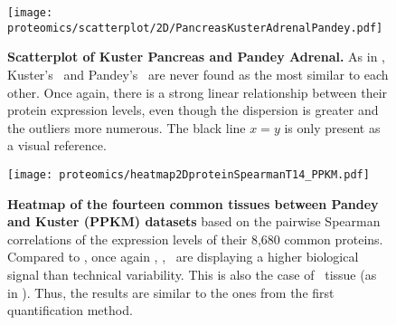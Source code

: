 \begin{figure}[!htpb]
    \texttt{[image: proteomics/scatterplot/2D/PancreasKusterAdrenalPandey.pdf]}\centering
    \caption[Kuster Pancreas vs Pandey Adrenal]{\label{fig:scat2DAdrenalPandeyPancreasKuster}\textbf{%
    Scatterplot of Kuster Pancreas and Pandey Adrenal.}
    As in ,
    Kuster's \pancreas\ and Pandey's \adrenal\ are never found as the most similar
    to each other.
    Once again,
    there is a strong linear relationship between their protein expression levels,
    even though the dispersion is greater and the outliers more numerous.
    {\small The black line $x=y$ is only present as a visual reference.}}
\end{figure}


\begin{figure}[!htpb]
    \texttt{[image: proteomics/heatmap2DproteinSpearmanT14\_PPKM.pdf]}\centering
    \caption[Heatmap of the 14 common tissues between Pandey and Kuster
    (Spearman correlation --- PPKM)]{\label{fig:heatmap3DProtT14PPKM}\textbf{Heatmap
    of the fourteen common tissues between Pandey and Kuster (PPKM) datasets}
    based on the pairwise Spearman correlations of the expression levels of
    their 8,680 common proteins.
    Compared to ,
    once again \Placenta, \Lung, \Kidney\ are displaying a higher biological signal
    than technical variability.
    This is also the case of \Adrenal\ tissue (as in ).
    Thus, the results are similar to the ones from the first quantification method.}
\end{figure}
